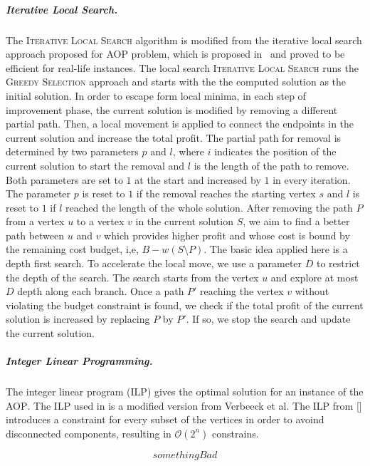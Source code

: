 \documentclass[sigconf,natbib=false]{acmart}
\newcommand{\greedy}{\textsc{Greedy Selection}\xspace}
\newcommand{\ils}{\textsc{Iterative Local Search}\xspace}
\newcommand{\AOP}{\textsc{AOP}\xspace}
\begin{document}
\subparagraph*{\textbf{Iterative Local Search.}}
The \ils algorithm is modified from the iterative local search approach proposed for \AOP problem, which is proposed in~\cite{} and proved to be efficient for real-life instances. 
The local search \ils runs the \greedy approach and starts with the the computed solution as the initial solution.
In order to escape form local minima, in each step of improvement phase, the current solution is modified by removing a different partial path. Then, a local movement is applied to connect the endpoints in the current solution and increase the total profit.
The partial path for removal is determined by two parameters $p$ and $l$, where $i$ indicates the position of the current solution to start the removal and $l$ is the length of the path to remove. 
Both parameters are set to $1$ at the start and increased by $1$ in every iteration. The parameter $p$ is reset to $1$ if the removal reaches the starting vertex $s$ and $l$ is reset to $1$ if $l$ reached the length of the whole solution.     
After removing the path $P$ from a vertex $u$ to a vertex $v$ in the current solution $S$, we aim to find a better path between $u$ and $v$ which provides higher profit and whose cost is bound by the remaining cost budget, i,e, $B- w(S\setminus P)$.    
The basic idea applied here is a depth first search. To accelerate the local move, we use a parameter $D$ to restrict the depth of the search. The search starts from  the vertex $u$ and explore at most $D$ depth along each branch. Once a path $P'$ reaching the vertex $v$  without violating the budget constraint is found, we check if the total profit of the current solution is increased by replacing $P$ by $P'$. 
If so, we stop the search and update the current solution. 
  
 

\subparagraph*{\textbf{Integer Linear Programming.}}
The integer linear program (ILP) gives the optimal solution for an instance of the \AOP. The ILP used in \tG is a modified version from Verbeeck et al. 
The ILP from [] introduces a constraint for every subset of the vertices in order to avoind disconnected components, resulting in $\mathcal{O}(2^n)$ constrains.

\begin{equation}
  something Bad
  \label{exponential_ILP}
\end{equation}
\end{document}
